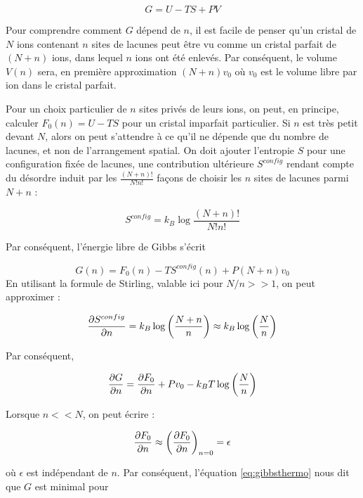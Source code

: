 \begin{equation}
    G = U - TS + PV
\end{equation}

Pour comprendre comment $G$ dépend de $n$, il est facile de penser qu'un cristal de $N$ ions contenant $n$ sites de lacunes peut être vu comme un cristal parfait de $(N+n)$ ions, dans lequel $n$ ions ont été enlevés. Par conséquent, le volume $V(n)$ sera, en première approximation $(N+n)v_0$ où $v_0$ est le volume libre par ion dans le cristal parfait.

Pour un choix particulier de $n$ sites privés de leurs ions, on peut, en principe, calculer $F_0(n) = U - TS$ pour un cristal imparfait particulier. Si $n$ est très petit devant $N$, alors on peut s'attendre à ce qu'il ne dépende que du nombre de lacunes, et non de l'arrangement spatial. On doit ajouter l'entropie $S$ pour une configuration fixée de lacunes, une contribution ultérieure $S^{config}$ rendant compte du désordre induit par les $\frac{(N+n)!}{N!n!}$ façons de choisir les $n$ sites de lacunes parmi $N+n$ :

\begin{equation}
    S^{config} = k_B \log \frac{(N+n)!}{N!n!}
\end{equation}

Par conséquent, l'énergie libre de Gibbs s'écrit

\begin{equation}
    G(n) = F_0 (n) - TS^{config}(n) + P(N+n)v_0
\end{equation}
En utilisant la formule de Stirling, valable ici pour $N/n >> 1$, on peut approximer :

\begin{equation}
    \frac{\partial S^{config}}{\partial n} = k_B \log \left( \frac{N+n}{n} \right) \approx k_B \log \left( \frac{N}{n} \right)
\end{equation}

Par conséquent,

\begin{equation}
    \frac{\partial G}{\partial n} = \frac{\partial F_0}{\partial n} + Pv_0 - k_B T \log \left( \frac{N}{n} \right)
    \label{eq:gibbsthermo}
\end{equation}

Lorsque $n<<N$, on peut écrire :

\begin{equation}
    \frac{\partial F_0}{\partial n} \approx \left( \frac{\partial F_0}{\partial n} \right)_{n=0} = \epsilon
\end{equation}

où $\epsilon$ est indépendant de $n$. Par conséquent, l'équation \ref{eq:gibbsthermo} nous dit que $G$ est minimal pour

